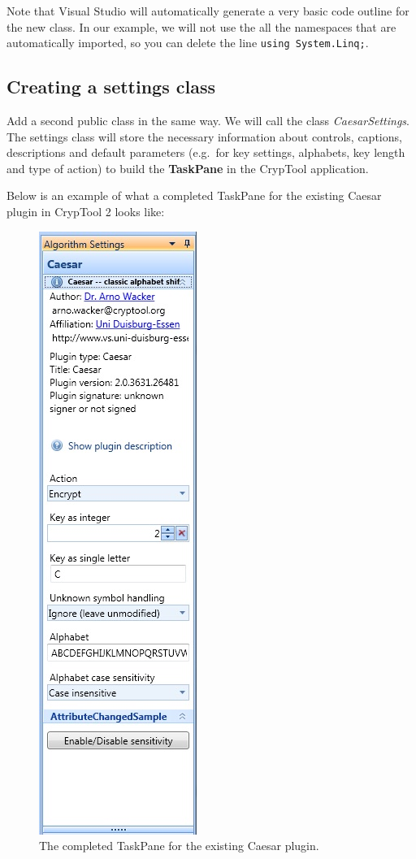 Note that Visual Studio will automatically generate a very basic code outline for the new class. In our example, we will not use the all the namespaces that are automatically imported, so you can delete the line \texttt{using System.Linq;}.

\subsection{Creating a settings class}
\label{sec:CreatingASettingsClass}

Add a second public class in the same way. We will call the class \textit{CaesarSettings}. The settings class will store the necessary information about controls, captions, descriptions and default parameters (e.g.\ for key settings, alphabets, key length and type of action) to build the \textbf{TaskPane} in the CrypTool application.
\clearpage

\noindent Below is an example of what a completed TaskPane for the existing Caesar plugin in CrypTool 2 looks like:

\begin{figure}[h!]
	\centering
		\includegraphics{figures/task_pane.jpg}
	\caption{The completed TaskPane for the existing Caesar plugin.}
	\label{fig:task_pane}
\end{figure}
\clearpage

